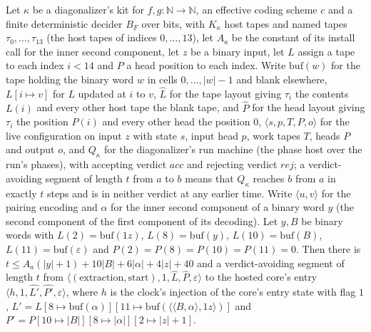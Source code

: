 \begin{theorem}
\label{Turing.NTimeDiag.dz_rewrite}
\leanok
{}
Let $\kappa$ be a diagonalizer's kit for $f, g : \mathbb{N} \to \mathbb{N}$, an effective coding scheme $c$ and a finite deterministic decider $B_F$ over bits, with $K_\kappa$ host tapes and named tapes $\tau_0, \dots, \tau_{13}$ (the host tapes of indices $0, \dots, 13$), let $A_a$ be the constant of its install call for the inner second component, let $z$ be a binary input, let $L$ assign a tape to each index $i < 14$ and $P$ a head position to each index. Write $\mathrm{buf}(w)$ for the tape holding the binary word $w$ in cells $0, \dots, |w| - 1$ and blank elsewhere, $L[i \mapsto v]$ for $L$ updated at $i$ to $v$, $\hat L$ for the tape layout giving $\tau_i$ the contents $L(i)$ and every other host tape the blank tape, and $\hat P$ for the head layout giving $\tau_i$ the position $P(i)$ and every other head the position $0$, $\langle s, p, T, P, o\rangle$ for the live configuration on input $z$ with state $s$, input head $p$, work tapes $T$, heads $P$ and output $o$, and $Q_\kappa$ for the diagonalizer's run machine (the phase host over the run's phases), with accepting verdict $\mathit{acc}$ and rejecting verdict $\mathit{rej}$; a verdict-avoiding segment of length $t$ from $a$ to $b$ means that $Q_\kappa$ reaches $b$ from $a$ in exactly $t$ steps and is in neither verdict at any earlier time. Write $\langle u, v\rangle$ for the pairing encoding and $\alpha$ for the inner second component of a binary word $y$ (the second component of the first component of its decoding). Let $y, B$ be binary words with $L(2) = \mathrm{buf}(1z)$, $L(8) = \mathrm{buf}(y)$, $L(10) = \mathrm{buf}(B)$, $L(11) = \mathrm{buf}(\varepsilon)$ and $P(2) = P(8) = P(10) = P(11) = 0$. Then there is $t \le A_a(|y| + 1) + 10|B| + 6|\alpha| + 4|z| + 40$ and a verdict-avoiding segment of length $t$ from $\langle (\text{extraction}, \text{start}), 1, \hat L, \hat P, \varepsilon\rangle$ to the hosted core's entry $\langle h, 1, \hat{L'}, \hat{P'}, \varepsilon\rangle$, where $h$ is the clock's injection of the core's entry state with flag $1$, $L' = L[8 \mapsto \mathrm{buf}(\alpha)][11 \mapsto \mathrm{buf}(\langle\langle B, \alpha\rangle, 1z\rangle)]$ and $P' = P[10 \mapsto |B|][8 \mapsto |\alpha|][2 \mapsto |z| + 1]$.
\end{theorem}

